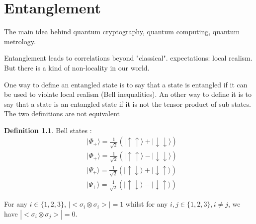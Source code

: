 \documentclass[a4paper]{book}
\theoremstyle{definition}
\newtheorem{definition}{Definition}[section]
\theoremstyle{remark}
\begin{document}
\chapter{Entanglement}

The main idea behind quantum cryptography, quantum computing, quantum metrology. \par \medskip 

Entanglement leads to correlations beyond "classical". expectations: local realism. But there is a kind of non-locality in our world. \par \medskip 

One way to define an entangled state is to say that a state is entangled if it can be used to violate local realism (Bell inequalities). An other way to define it is to say that a state is an entangled state if it is not the tensor product of sub states. The two definitions are not equivalent \par \medskip 

\begin{definition}
    Bell states :
    \begin{equation}
        \begin{aligned}
            &|\Phi_+ \rangle = \frac{1}{\sqrt{2}}\left( |\uparrow\uparrow\rangle + |\downarrow\downarrow\rangle\right) \\
            &|\Phi_+ \rangle = \frac{1}{\sqrt{2}}\left( |\uparrow\uparrow\rangle - |\downarrow\downarrow\rangle\right) \\
            &|\Psi_+ \rangle = \frac{1}{\sqrt{2}}\left( |\uparrow\downarrow\rangle + |\downarrow\uparrow\rangle\right) \\ 
            &|\Psi_+ \rangle = \frac{1}{\sqrt{2}}\left( |\uparrow\downarrow\rangle - |\downarrow\uparrow\rangle\right)
        \end{aligned}
    \end{equation}
\end{definition}

For any $i \in \{1, 2,3\}$, $|<\sigma_i \otimes \sigma_i>| = 1$ whilst for any $i,j \in \{1, 2,3\}, i\neq j$, we have $|<\sigma_i \otimes \sigma_j>| = 0$.
\end{document}

